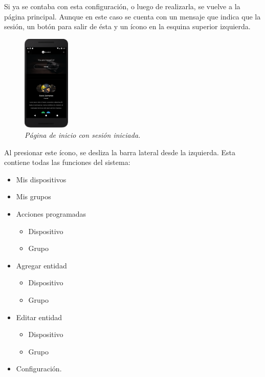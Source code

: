 Si ya se contaba con esta configuración, o luego de realizarla, se vuelve a la página principal. Aunque en este caso se cuenta con un mensaje que indica que la sesión, un botón para salir de ésta y un ícono en la esquina superior izquierda.~

\begin{figure}[H]
  \centering
  \includegraphics[width=0.2\textwidth, keepaspectratio]{images/app-movil-login-success}
  \caption{\textit{Página de inicio con sesión iniciada.}}
  \label{fig:app-movil-login-success}
\end{figure}

Al presionar este ícono, se desliza la barra lateral desde la izquierda. Esta contiene todas las funciones del sistema: 

\begin{itemize}
  \item Mis dispositivos
  \item Mis grupos
  \item Acciones programadas
    \begin{itemize}
      \item Dispositivo
      \item Grupo
    \end{itemize}
  \item Agregar entidad
    \begin{itemize}
      \item Dispositivo
      \item Grupo
    \end{itemize}
  \item Editar entidad
    \begin{itemize}
      \item Dispositivo
      \item Grupo
    \end{itemize}
  \item Configuración.
\end{itemize}

